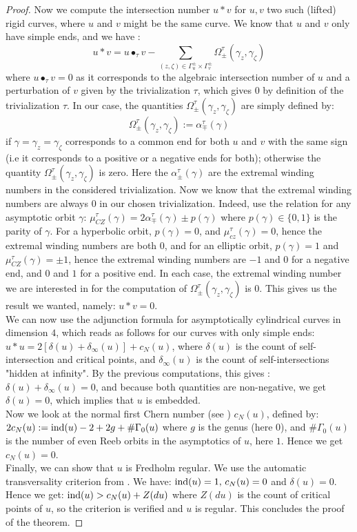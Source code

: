 \documentclass[../main.tex]{subfiles}
\begin{document}
\begin{proof}
Now we compute the intersection number $u*v$ for $u,v$ two such (lifted) rigid curves, where $u$ and $v$ might be the same curve. We know that $u$ and $v$ only have simple ends, and we have :
$$u*v = u\bullet_\tau v - \sum_{(z,\zeta)\in\Gamma^\pm_u\times \Gamma^\pm_v}\Omega_\pm^\tau(\gamma_z,\gamma_\zeta)$$
where $u\bullet_\tau v = 0$ as it corresponds to the algebraic intersection number of $u$ and a perturbation of $v$ given by the trivialization $\tau$, which gives $0$ by definition of the trivialization $\tau$. In our case, the quantities $\Omega_\pm^\tau(\gamma_z,\gamma_\zeta)$ are simply defined by: $$\Omega_\pm^\tau(\gamma_z,\gamma_\zeta) := \alpha_\mp^\tau(\gamma)$$
if $\gamma= \gamma_z = \gamma_\zeta$ corresponds to a common end for both $u$ and $v$ with the same sign (i.e it corresponds to a positive or a negative ends for both); otherwise the quantity $\Omega_\pm^\tau(\gamma_z,\gamma_\zeta)$ is zero. Here the $\alpha_\pm^\tau(\gamma)$ are the extremal winding numbers in the considered trivialization. 
Now we know that the extremal winding numbers are always $0$ in our chosen trivialization. Indeed, use the relation for any asymptotic orbit $\gamma$: $\mu_{CZ}^\tau(\gamma) =2\alpha_\mp^\tau(\gamma) \pm p(\gamma) $ where $p(\gamma)\in\{0,1\}$ is the parity of $\gamma$. For a hyperbolic orbit, $p(\gamma) = 0$, and $\mu_{cz}^\tau(\gamma) = 0$, hence the extremal winding numbers are both $0$, and for an elliptic orbit, $p (\gamma) = 1$ and $\mu_{CZ}^\tau(\gamma) = \pm 1$, hence the extremal winding numbers are $-1$ and $0$ for a negative end, and $0$ and $1$ for a positive end. In each case, the extremal winding number we are interested in for the computation of $\Omega_\pm^\tau(\gamma_z,\gamma_\zeta)$ is $0$. This gives us the result we wanted, namely: $u*v = 0$. \\

We can now use the adjunction formula for asymptotically cylindrical curves in dimension $4$, which reads as follows for our curves with only simple ends: $u*u = 2[\delta(u) + \delta_\infty(u)] + c_N(u)$, where $\delta(u)$ is the count of self-intersection and critical points, and $\delta_\infty(u)$ is the count of self-intersections "hidden at infinity". By the previous computations, this gives : $\delta(u) + \delta_\infty(u) = 0$, and because both quantities are non-negative, we get $\delta(u) = 0$, which implies that $u$ is embedded.\\

Now we look at the normal first Chern number (see \cite{wendl_automatic_2009}) $c_N(u)$, defined by: $2c_N(u) := \text{ind}(u) - 2 + 2g + \#\Gamma_0(u)$ where $g$ is the genus (here $0$), and $\#\Gamma_0(u)$ is the number of even Reeb orbits in the asymptotics of $u$, here $1$. Hence we get $c_N(u) = 0$.\\

Finally, we can show that $u$ is Fredholm regular. We use the automatic transversality criterion from \cite{wendl_automatic_2009}. We have: $\text{ind}(u) = 1, \,c_N(u) = 0$ and $\delta(u) = 0$. Hence we get: $\text{ind}(u) > c_N(u) + Z(du)$ where $Z(du) $ is the count of critical points of $u$, so the criterion is verified and $u$ is regular. This concludes the proof of the theorem. 
\end{proof}
\end{document}
